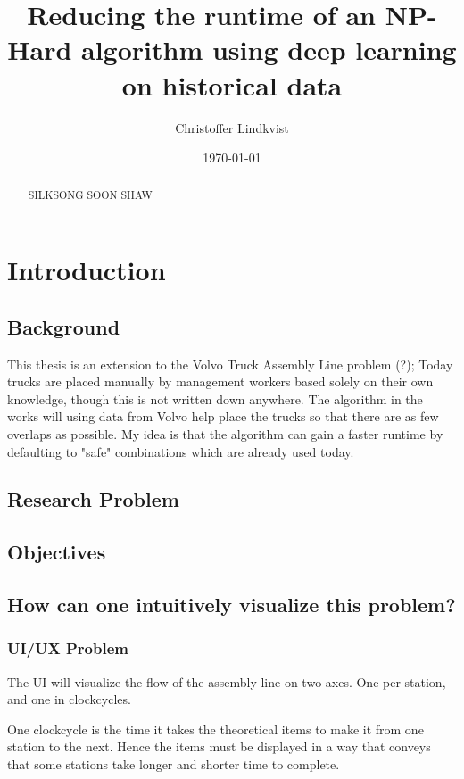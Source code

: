 \documentclass[12pt,a4paper]{report}
\begin{document}
\title{Reducing the runtime of an NP-Hard algorithm using deep learning on historical data}
\author{Christoffer Lindkvist}
\date{\today}
\maketitle

\begin{abstract}
    SILKSONG SOON SHAW 
\end{abstract}

\tableofcontents
\listoffigures

\chapter{Introduction}
\section{Background}
    This thesis is an extension to the Volvo Truck Assembly Line problem (?); 
    Today trucks are placed manually by management workers based solely on their own knowledge, 
    though this is not written down anywhere. 
    The algorithm in the works will using data from Volvo help place the trucks so that there are as few overlaps as possible. 
    My idea is that the algorithm can gain a faster runtime by defaulting to "safe" combinations which are already used today.
    
\section{Research Problem}
\section{Objectives}
\section{How can one intuitively visualize this problem?}
\subsection{UI/UX Problem}
    The UI will visualize the flow of the assembly line on two axes. One per station, and one in clockcycles.
    
    One clockcycle is the time it takes the theoretical items to make it from one station to the next. Hence the items must be displayed in a way that conveys that some stations take longer and shorter time to complete.
\end{document}
